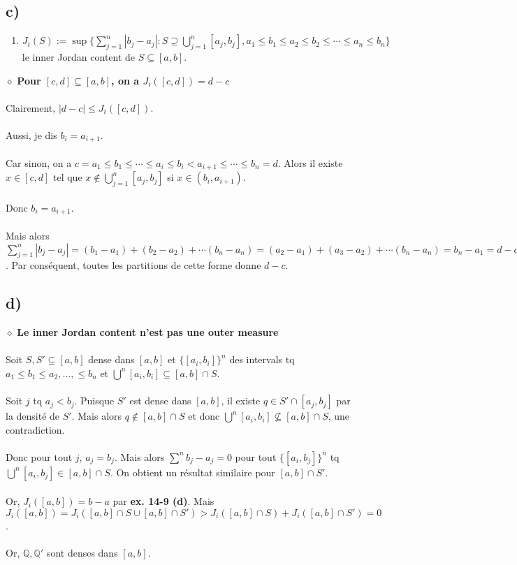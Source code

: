 \documentclass[a4paper,10pt]{article}
\begin{document}
\subsection*{c)}
\begin{enumerate}
	\item $J_i (S) := \sup \{\sum_{j=1}^n |b_j - a_j| : S \supseteq \bigcup_{j=1}^n [a_j,b_j], a_1 \leq b_1 \leq a_2 \leq b_2 \leq \cdots \leq a_n \leq b_n\}$ le inner Jordan content de $S \subseteq [a,b]$.
\end{enumerate}
$\diamond$ \textbf{Pour $[c,d] \subseteq [a,b]$, on a $J_i ([c,d]) = d - c$}
\\
\\
Clairement, $|d - c| \leq J_i ([c,d])$. 
\\
\\
Aussi, je dis $b_i = a_{i+1}$.
\\
\\
Car sinon, on a $c = a_1 \leq b_1 \leq \cdots \leq a_i \leq b_i < a_{i+1} \leq \cdots \leq b_n = d$. Alors il existe $x \in [c,d]$ tel que $x \not \in \bigcup_{j=1}^n [a_j, b_j]$ si $x \in (b_i, a_{i+1})$.
\\
\\
Donc $b_i = a_{i+1}$.
\\
\\
Mais alors $\sum_{j=1}^n |b_j - a_j| = (b_1 - a_1) + (b_2 - a_2) + \cdots (b_n - a_n) = (a_2 - a_1) + (a_3 - a_2) + \cdots (b_n - a_n) = b_n - a_1 = d - c$. Par conséquent, toutes les partitions de cette forme donne $d - c$.

\subsection*{d)}
$\diamond$ \textbf{Le inner Jordan content n'est pas une outer measure}
\\
\\
Soit $S,S' \subseteq [a,b]$ dense dans $[a,b]$ et $\{[a_i, b_i]\}^n$ des intervals tq $a_1 \leq b_1 \leq a_2, ..., \leq b_n$ et $\bigcup^n [a_i,b_i] \subseteq [a,b] \cap S$.
\\
\\
Soit $j$ tq $a_j < b_j$. Puisque $S'$ est dense dans $[a,b]$, il existe $q \in S' \cap [a_j, b_j]$ par la densité de $S'$. Mais alors $q \not\in [a,b] \cap S$ et donc $\bigcup^n [a_i, b_i] \not\subseteq [a,b] \cap S$, une contradiction.
\\
\\
Donc pour tout $j$, $a_j = b_j$. Mais alors $\sum^n b_j - a_j = 0$ pour tout $\{ [a_i, b_j]\}^n$ tq $\bigcup^n [a_i, b_j] \in [a,b] \cap S$. On obtient un résultat similaire pour $[a,b] \cap S'$.
\\
\\
Or, $J_i ([a,b]) = b - a$ par \textbf{ex. 14-9 (d)}. Mais $J_i ([a,b]) = J_i ([a,b] \cap S \cup [a,b] \cap S') > J_i([a,b] \cap S) + J_i([a,b] \cap S') = 0$.   
\\
\\
Or, $\mathbb{Q}, \mathbb{Q}'$ sont denses dans $[a,b]$.
\end{document}
